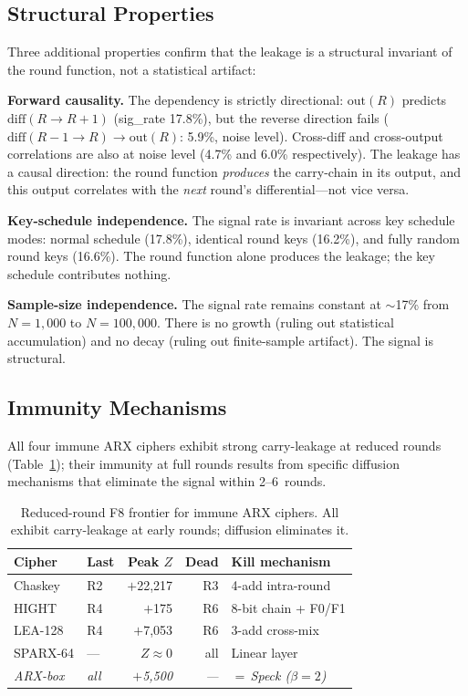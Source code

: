 \documentclass[conference,a4paper]{IEEEtran}
\begin{document}
\subsection{Structural Properties}

Three additional properties confirm that the leakage is a structural invariant of the round function, not a statistical artifact:

\textbf{Forward causality.} The dependency is strictly directional: $\mathrm{out}(R)$ predicts $\mathrm{diff}(R {\to} R{+}1)$ (sig\_rate 17.8\%), but the reverse direction fails ($\mathrm{diff}(R{-}1 {\to} R) \to \mathrm{out}(R)$: 5.9\%, noise level). Cross-diff and cross-output correlations are also at noise level (4.7\% and 6.0\% respectively). The leakage has a causal direction: the round function \emph{produces} the carry-chain in its output, and this output correlates with the \emph{next} round's differential---not vice versa.

\textbf{Key-schedule independence.} The signal rate is invariant across key schedule modes: normal schedule (17.8\%), identical round keys (16.2\%), and fully random round keys (16.6\%). The round function alone produces the leakage; the key schedule contributes nothing.

\textbf{Sample-size independence.} The signal rate remains constant at $\sim$17\% from $N = 1{,}000$ to $N = 100{,}000$. There is no growth (ruling out statistical accumulation) and no decay (ruling out finite-sample artifact). The signal is structural.

\subsection{Immunity Mechanisms}

All four immune ARX ciphers exhibit strong carry-leakage at reduced rounds (Table~\ref{tab:immunity}); their immunity at full rounds results from specific diffusion mechanisms that eliminate the signal within 2--6~rounds.

\begin{table}[t]
\centering
\caption{Reduced-round F8 frontier for immune ARX ciphers. All exhibit carry-leakage at early rounds; diffusion eliminates it.}
\label{tab:immunity}
\small
\begin{tabular}{@{}llrrl@{}}
\toprule
\textbf{Cipher} & \textbf{Last} & \textbf{Peak $Z$} & \textbf{Dead} & \textbf{Kill mechanism} \\
\midrule
Chaskey    & R2 & $+$22,217 & R3 & 4-add intra-round \\
HIGHT      & R4 & $+$175  & R6 & 8-bit chain + F0/F1 \\
LEA-128    & R4 & $+$7,053 & R6 & 3-add cross-mix \\
SPARX-64       & --- & $Z \approx 0$ & all & Linear layer \\
\rowcolor{orange!12} \quad\textit{ARX-box} & \textit{all} & \textit{$+$5,500} & \textit{---} & \textit{$=$\,Speck ($\beta{=}2$)} \\
\bottomrule
\end{tabular}
\end{table}
\end{document}
